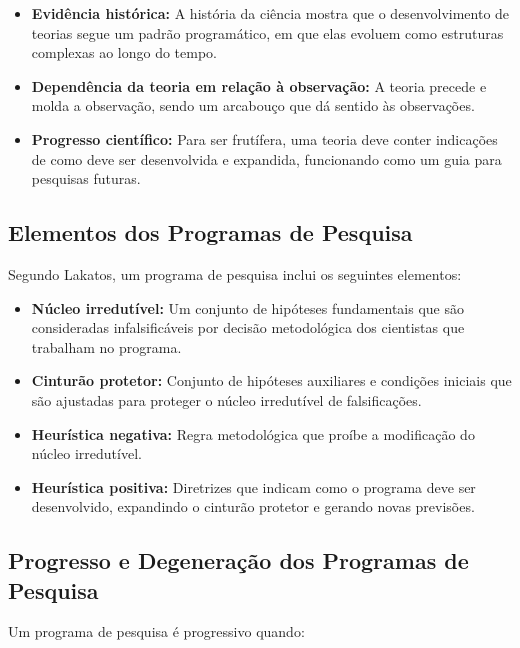 \documentclass{article} %
\begin{document}
\begin{itemize}
    \item \textbf{Evidência histórica:} A história da ciência mostra que o desenvolvimento de teorias segue um padrão programático, em que elas evoluem como estruturas complexas ao longo do tempo.
    
    \item \textbf{Dependência da teoria em relação à observação:} A teoria precede e molda a observação, sendo um arcabouço que dá sentido às observações.
    
    \item \textbf{Progresso científico:} Para ser frutífera, uma teoria deve conter indicações de como deve ser desenvolvida e expandida, funcionando como um guia para pesquisas futuras.
\end{itemize}

\subsection{Elementos dos Programas de Pesquisa}

Segundo Lakatos, um programa de pesquisa inclui os seguintes elementos:

\begin{itemize}
    \item \textbf{Núcleo irredutível:} Um conjunto de hipóteses fundamentais que são consideradas infalsificáveis por decisão metodológica dos cientistas que trabalham no programa.
    
    \item \textbf{Cinturão protetor:} Conjunto de hipóteses auxiliares e condições iniciais que são ajustadas para proteger o núcleo irredutível de falsificações.
    
    \item \textbf{Heurística negativa:} Regra metodológica que proíbe a modificação do núcleo irredutível.
    
    \item \textbf{Heurística positiva:} Diretrizes que indicam como o programa deve ser desenvolvido, expandindo o cinturão protetor e gerando novas previsões.
\end{itemize}

\subsection{Progresso e Degeneração dos Programas de Pesquisa}

Um programa de pesquisa é progressivo quando:
\end{document}
